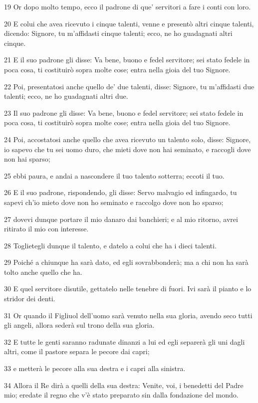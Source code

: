 \par 19 Or dopo molto tempo, ecco il padrone di que' servitori a fare i conti con loro.
\par 20 E colui che avea ricevuto i cinque talenti, venne e presentò altri cinque talenti, dicendo: Signore, tu m'affidasti cinque talenti; ecco, ne ho guadagnati altri cinque.
\par 21 E il suo padrone gli disse: Va bene, buono e fedel servitore; sei stato fedele in poca cosa, ti costituirò sopra molte cose; entra nella gioia del tuo Signore.
\par 22 Poi, presentatosi anche quello de' due talenti, disse: Signore, tu m'affidasti due talenti; ecco, ne ho guadagnati altri due.
\par 23 Il suo padrone gli disse: Va bene, buono e fedel servitore; sei stato fedele in poca cosa, ti costituirò sopra molte cose; entra nella gioia del tuo Signore.
\par 24 Poi, accostatosi anche quello che avea ricevuto un talento solo, disse: Signore, io sapevo che tu sei uomo duro, che mieti dove non hai seminato, e raccogli dove non hai sparso;
\par 25 ebbi paura, e andai a nascondere il tuo talento sotterra; eccoti il tuo.
\par 26 E il suo padrone, rispondendo, gli disse: Servo malvagio ed infingardo, tu sapevi ch'io mieto dove non ho seminato e raccolgo dove non ho sparso;
\par 27 dovevi dunque portare il mio danaro dai banchieri; e al mio ritorno, avrei ritirato il mio con interesse.
\par 28 Toglietegli dunque il talento, e datelo a colui che ha i dieci talenti.
\par 29 Poiché a chiunque ha sarà dato, ed egli sovrabbonderà; ma a chi non ha sarà tolto anche quello che ha.
\par 30 E quel servitore disutile, gettatelo nelle tenebre di fuori. Ivi sarà il pianto e lo stridor dei denti.
\par 31 Or quando il Figliuol dell'uomo sarà venuto nella sua gloria, avendo seco tutti gli angeli, allora sederà sul trono della sua gloria.
\par 32 E tutte le genti saranno radunate dinanzi a lui ed egli separerà gli uni dagli altri, come il pastore separa le pecore dai capri;
\par 33 e metterà le pecore alla sua destra e i capri alla sinistra.
\par 34 Allora il Re dirà a quelli della sua destra: Venite, voi, i benedetti del Padre mio; eredate il regno che v'è stato preparato sin dalla fondazione del mondo.

